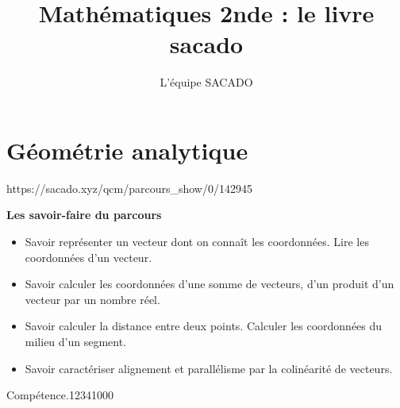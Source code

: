 



\title{Mathématiques 2nde  : le livre sacado}
\author{L'équipe SACADO}




\chapter{Géométrie analytique}
{https://sacado.xyz/qcm/parcours_show/0/142945}
{
 \begin{CpsCol}
	\textbf{Les savoir-faire du parcours}
 	\begin{itemize}
 		\item Savoir représenter un vecteur dont on connaît les coordonnées. Lire les coordonnées d'un
vecteur.
		\item Savoir calculer les coordonnées d'une somme de vecteurs, d'un produit d'un vecteur par un
nombre réel.
		\item Savoir calculer la distance entre deux points. Calculer les coordonnées du milieu d'un
segment.
		\item Savoir caractériser alignement et parallélisme par la colinéarité de vecteurs.
 	\end{itemize}
 \end{CpsCol}

\begin{His}
\end{His}

\begin{ExoDec}{Compétence.}{1234}{1}{0}{0}{0}
\end{ExoDec}
}


